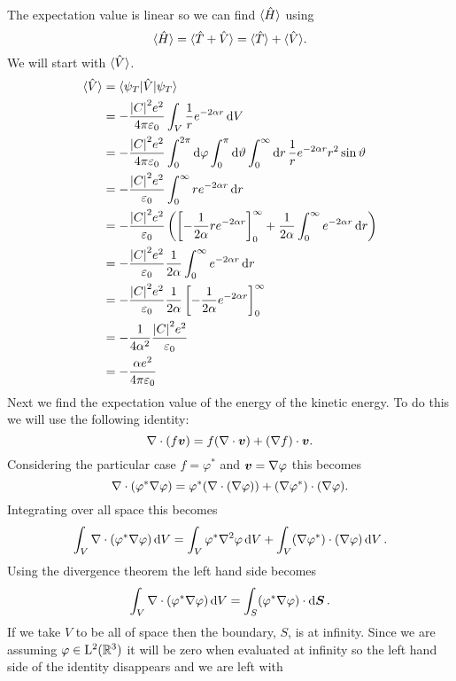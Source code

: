     The expectation value is linear so we can find \(\langle{\hat{H}}\rangle\) using
    \[\langle{\hat{H}}\rangle = \langle{\hat{T} + \hat{V}}\rangle = \langle{\hat{T}}\rangle + \langle{\hat{V}}\rangle.\]
    We will start with \(\langle{\hat{V}}\rangle\).
    \begin{align*}
        \langle{\hat{V}}\rangle &= \langle {\psi_T} \vert \hat{V} \vert {\psi_T} \rangle\\
        &= -\frac{\abs{C}^2e^2}{4\pi\varepsilon_0} \int_V\frac{1}{r}e^{-2\alpha r} \dd{V}\\
        &= -\frac{\abs{C}^2e^2}{4\pi\varepsilon_0} \int_0^{2\pi}\dd{\varphi} \int_0^\pi \dd{\vartheta} \int_0^\infty \dd{r} \frac{1}{r}e^{-2\alpha r} r^2\sin\vartheta\\
        &= -\frac{\abs{C}^2e^2}{\varepsilon_0} \int_0^\infty re^{-2\alpha r} \dd{r}\\
        &= -\frac{\abs{C}^2e^2}{\varepsilon_0} \left(\left[-\frac{1}{2\alpha} re^{-2\alpha r}\right]_0^{\infty} + \frac{1}{2\alpha} \int_0^{\infty} e^{-2\alpha r} \dd{r} \right)\\
        &= -\frac{\abs{C}^2e^2}{\varepsilon_0} \frac{1}{2\alpha} \int_0^{\infty} e^{-2\alpha r} \dd{r}\\
        &= -\frac{\abs{C}^2e^2}{\varepsilon_0}\frac{1}{2\alpha} \left[-\frac{1}{2\alpha} e^{-2\alpha r}\right]_0^{\infty}\\
        &= -\frac{1}{4\alpha^2}\frac{\abs{C}^2e^2}{\varepsilon_0}\\
        &= -\frac{\alpha e^2}{4\pi\varepsilon_0}
    \end{align*}
    Next we find the expectation value of the energy of the kinetic energy.
    To do this we will use the following identity:
    \[\nabla\cdot(f \bm{v}) = f(\nabla\cdot\bm{v}) + (\nabla f)\cdot\bm{v}.\]
    Considering the particular case \(f = \varphi^*\) and \(\bm{v} = \nabla\varphi\) this becomes
    \[\nabla\cdot(\varphi^*\nabla\varphi) = \varphi^*(\nabla\cdot(\nabla\varphi)) + (\nabla\varphi^*) \cdot (\nabla\varphi).\]
    Integrating over all space this becomes
    \[\int_V \nabla\cdot(\varphi^*\nabla\varphi) \dd{V} = \int_V \varphi^*\nabla^2\varphi \dd{V} + \int_V (\nabla\varphi^*)\cdot(\nabla\varphi) \dd{V}.\]
    Using the divergence theorem the left hand side becomes
    \[\int_V \nabla\cdot(\varphi^*\nabla\varphi) \dd{V} = \int_S (\varphi^*\nabla\varphi)\cdot\dd{\bm{S}}.\]
    If we take \(V\) to be all of space then the boundary, \(S\), is at infinity.
    Since we are assuming \(\varphi\in\operatorname{L^2}(\mathbb{R}^3)\) it will be zero when evaluated at infinity so the left hand side of the identity disappears and we are left with
